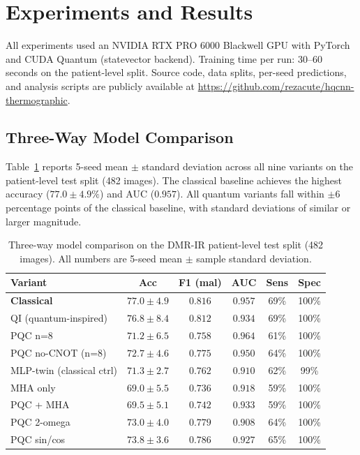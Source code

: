 \documentclass[conference]{IEEEtran}
\begin{document}
\section{Experiments and Results}

All experiments used an NVIDIA RTX PRO 6000 Blackwell GPU with PyTorch and CUDA Quantum (statevector backend). Training time per run: 30--60 seconds on the patient-level split. Source code, data splits, per-seed predictions, and analysis scripts are publicly available at \url{https://github.com/rezacute/hqcnn-thermographic}.

\subsection{Three-Way Model Comparison}
Table~\ref{tab:main} reports 5-seed mean $\pm$ standard deviation across all nine variants on the patient-level test split (482 images). The classical baseline achieves the highest accuracy ($77.0 \pm 4.9\%$) and AUC ($0.957$). All quantum variants fall within $\pm 6$ percentage points of the classical baseline, with standard deviations of similar or larger magnitude.

\begin{table}[h]
\centering
\caption{Three-way model comparison on the DMR-IR patient-level test split (482 images). All numbers are 5-seed mean $\pm$ sample standard deviation.}
\label{tab:main}
\begin{tabular}{lccccc}
\toprule
\textbf{Variant} & \textbf{Acc} & \textbf{F1 (mal)} & \textbf{AUC} & \textbf{Sens} & \textbf{Spec} \\
\midrule
\textbf{Classical}         & $\mathbf{77.0 \pm 4.9}$ & $\mathbf{0.816}$ & $\mathbf{0.957}$ & 69\% & 100\% \\
QI (quantum-inspired)     & $76.8 \pm 8.4$          & $0.812$          & $0.934$          & 69\% & 100\% \\
PQC n=8                   & $71.2 \pm 6.5$          & $0.758$          & $\mathbf{0.964}$ & 61\% & 100\% \\
PQC no-CNOT (n=8)         & $72.7 \pm 4.6$          & $0.775$          & $0.950$          & 64\% & 100\% \\
MLP-twin (classical ctrl) & $71.3 \pm 2.7$          & $0.762$          & $0.910$          & 62\% & 99\%  \\
MHA only                  & $69.0 \pm 5.5$          & $0.736$          & $0.918$          & 59\% & 100\% \\
PQC + MHA                 & $69.5 \pm 5.1$          & $0.742$          & $0.933$          & 59\% & 100\% \\
PQC 2-omega               & $73.0 \pm 4.0$          & $0.779$          & $0.908$          & 64\% & 100\% \\
PQC sin/cos               & $73.8 \pm 3.6$          & $0.786$          & $0.927$          & 65\% & 100\% \\
\bottomrule
\end{tabular}
\end{table}
\end{document}
